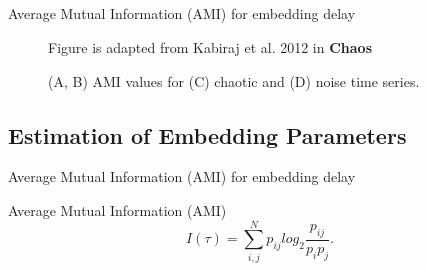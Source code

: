 \subsection{}
{

\begin{frame}{Average Mutual Information (AMI) for embedding delay}
    \begin{figure}
        \centering
	{Figure is adapted from Kabiraj et al. 2012 in {\bf Chaos}}
	\caption{(A, B) AMI values for (C) chaotic and (D) noise time series.} 
   \end{figure}
	
\end{frame}
}





\subsection{Estimation of Embedding Parameters}
{

\begin{frame}{Average Mutual Information (AMI) for embedding delay}

\begin{block}{Average Mutual Information (AMI)}
\begin{equation*}
I(\tau) = \sum_{i,j}^N p_{ij} log_2 \frac{ p_{ij} }{ p_i p_j }.
\end{equation*}
\end{block}

\end{frame}
}






